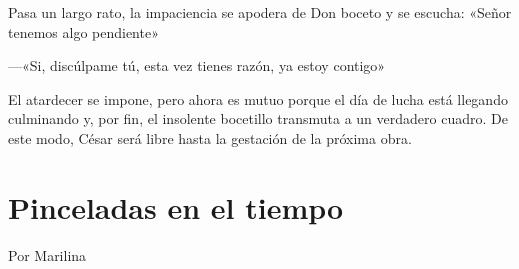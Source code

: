 \documentclass[11pt,twoside,openright,a5paper]{book}
\begin{document}
Pasa un largo rato, la impaciencia se apodera de Don boceto y se escucha: «Señor tenemos algo pendiente»

---«Si, discúlpame tú, esta vez tienes razón, ya estoy contigo»

El atardecer se impone, pero ahora es mutuo porque el día de lucha está llegando culminando y, por fin, el insolente bocetillo transmuta a un verdadero cuadro. De este modo, César será libre hasta la gestación de la próxima obra.

\section*{Pinceladas en el tiempo}

\begin{flushright}Por Marilina\end{flushright}
\end{document}
